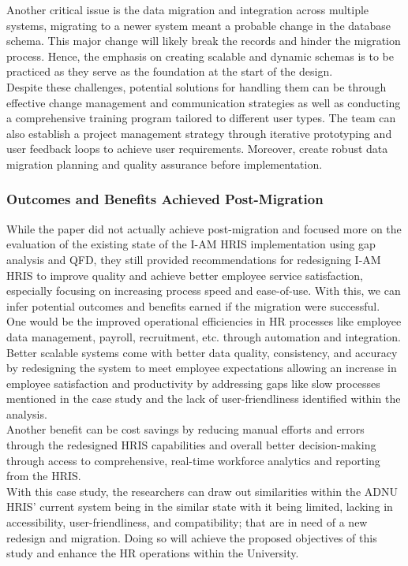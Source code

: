         Another critical issue is the data migration and integration across multiple systems, migrating to a newer system meant a probable change in the database schema. This major change will likely break the records and hinder the migration process. Hence, the emphasis on creating scalable and dynamic schemas is to be practiced as they serve as the foundation at the start of the design.
        \\
        
        Despite these challenges, potential solutions for handling them can be through effective change management and communication strategies as well as conducting a comprehensive training program tailored to different user types. The team can also establish a project management strategy through iterative prototyping and user feedback loops to achieve user requirements. Moreover, create robust data migration planning and quality assurance before implementation.
        \\
        
        \subsubsection{Outcomes and Benefits Achieved Post-Migration}
        While the paper did not actually achieve post-migration and focused more on the evaluation of the existing state of the I-AM HRIS implementation using gap analysis and QFD, they still provided recommendations for redesigning I-AM HRIS to improve quality and achieve better employee service satisfaction, especially focusing on increasing process speed and ease-of-use. With this, we can infer potential outcomes and benefits earned if the migration were successful. 
        \\

        One would be the improved operational efficiencies in HR processes like employee data management, payroll, recruitment, etc. through automation and integration. Better scalable systems come with better data quality, consistency, and accuracy by redesigning the system to meet employee expectations allowing an increase in employee satisfaction and productivity by addressing gaps like slow processes mentioned in the case study and the lack of user-friendliness identified within the analysis.
        \\

        Another benefit can be cost savings by reducing manual efforts and errors through the redesigned HRIS capabilities and overall better decision-making through access to comprehensive, real-time workforce analytics and reporting from the HRIS.
        \\

        With this case study, the researchers can draw out similarities within the ADNU HRIS' current system being in the similar state with it being limited, lacking in accessibility, user-friendliness, and compatibility; that are in need of a new redesign and migration. Doing so will achieve the proposed objectives of this study and enhance the HR operations within the University.